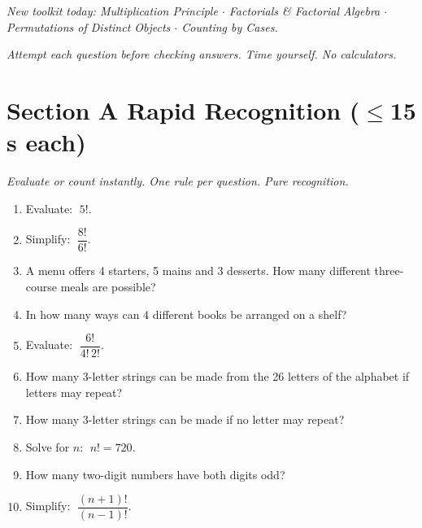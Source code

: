 \documentclass[11pt,a4paper]{article}
\begin{document}
\noindent\textit{New toolkit today: Multiplication Principle $\cdot$ Factorials \& Factorial Algebra $\cdot$ Permutations of Distinct Objects $\cdot$ Counting by Cases.}

\vspace{2pt}
\noindent\textit{Attempt each question before checking answers. Time yourself. No calculators.}

\section*{Section A \quad Rapid Recognition \hfill{\normalfont\small($\leq$15 s each)}}

\noindent\textit{Evaluate or count instantly. One rule per question. Pure recognition.}

\begin{enumerate}

\item Evaluate: $\;5!$.

\item Simplify: $\;\dfrac{8!}{6!}$.

\item A menu offers 4 starters, 5 mains and 3 desserts. How many different three-course meals are possible?

\item In how many ways can 4 different books be arranged on a shelf?

\item Evaluate: $\;\dfrac{6!}{4!\,2!}$.

\item How many 3-letter strings can be made from the 26 letters of the alphabet if letters may repeat?

\item How many 3-letter strings can be made if no letter may repeat?

\item Solve for $n$: $\;n! = 720$.

\item How many two-digit numbers have both digits odd?

\item Simplify: $\;\dfrac{(n+1)!}{(n-1)!}$.

\end{enumerate}
\end{document}
